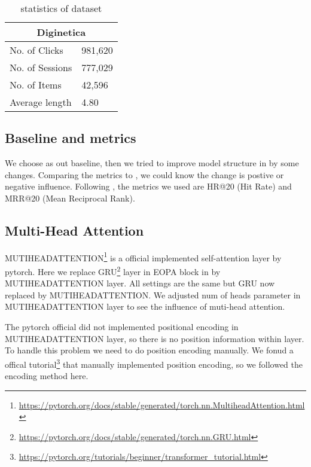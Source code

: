 \documentclass{article}
\begin{document}
\begin{table}
    \caption{statistics of dataset}
    \label{data-stats}
    \centering
    \begin{tabular}{ll}
        \toprule
        \multicolumn{2}{c}{Diginetica} \\
        \midrule
        No. of Clicks   & 981,620      \\
        No. of Sessions & 777,029      \\
        No. of Items    & 42,596       \\
        Average length  & 4.80         \\
        \bottomrule
    \end{tabular}
\end{table}

\subsection{Baseline and metrics}

We choose \cite{chen2020lessr} as out baseline,
then we tried to improve model structure in \cite{chen2020lessr} by some changes.
Comparing the metrics to \cite{chen2020lessr},
we could know the change is postive or negative influence.
Following \cite{chen2020lessr},
the metrics we used are HR@20 (Hit Rate) and MRR@20 (Mean Reciprocal Rank).

\subsection{Multi-Head Attention}

MUTIHEADATTENTION\footnote{\url{https://pytorch.org/docs/stable/generated/torch.nn.MultiheadAttention.html}}
is a official implemented self-attention layer by pytorch.
Here we replace GRU\footnote{\url{https://pytorch.org/docs/stable/generated/torch.nn.GRU.html}}
layer in EOPA block in \cite{chen2020lessr} by MUTIHEADATTENTION layer.
All settings are the same but GRU now replaced by MUTIHEADATTENTION.
We adjusted num of heads parameter in MUTIHEADATTENTION layer
to see the influence of muti-head attention.

The pytorch official did not implemented positional encoding in
MUTIHEADATTENTION layer, so there is no position information within layer.
To handle this problem we need to do position encoding manually.
We fonud a offical tutorial\footnote{\url{https://pytorch.org/tutorials/beginner/transformer_tutorial.html}}
that manually implemented position encoding,
so we followed the encoding method here.
\end{document}
